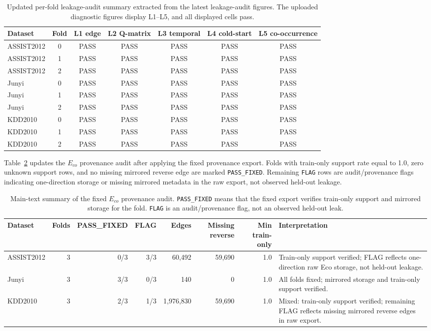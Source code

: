 \documentclass[11pt,a4paper]{article}
\newcommand{\Eco}{$E_{co}$}
\begin{document}
\begin{table}[H]
\centering
\caption{Updated per-fold leakage-audit summary extracted from the latest leakage-audit figures. The uploaded diagnostic figures display L1--L5, and all displayed cells pass.}
\label{tab:leakage}
\begin{tabular}{lcccccc}
\toprule
Dataset & Fold & L1 edge & L2 Q-matrix & L3 temporal & L4 cold-start & L5 co-occurrence \\
\midrule
ASSIST2012 & 0 & PASS & PASS & PASS & PASS & PASS \\
ASSIST2012 & 1 & PASS & PASS & PASS & PASS & PASS \\
ASSIST2012 & 2 & PASS & PASS & PASS & PASS & PASS \\
Junyi & 0 & PASS & PASS & PASS & PASS & PASS \\
Junyi & 1 & PASS & PASS & PASS & PASS & PASS \\
Junyi & 2 & PASS & PASS & PASS & PASS & PASS \\
KDD2010 & 0 & PASS & PASS & PASS & PASS & PASS \\
KDD2010 & 1 & PASS & PASS & PASS & PASS & PASS \\
KDD2010 & 2 & PASS & PASS & PASS & PASS & PASS \\
\bottomrule
\end{tabular}
\end{table}


Table~\ref{tab:eco-prov} updates the \Eco{} provenance audit after applying the fixed provenance export. Folds with train-only support rate equal to 1.0, zero unknown support rows, and no missing mirrored reverse edge are marked \texttt{PASS\_FIXED}. Remaining \texttt{FLAG} rows are audit/provenance flags indicating one-direction storage or missing mirrored metadata in the raw export, not observed held-out leakage.

\begin{table}[H]
\centering
\caption{Main-text summary of the fixed \Eco{} provenance audit. \texttt{PASS\_FIXED} means that the fixed export verifies train-only support and mirrored storage for the fold. \texttt{FLAG} is an audit/provenance flag, not an observed held-out leak.}
\label{tab:eco-prov}
\scriptsize
\begin{tabularx}{\textwidth}{lrrrrrrX}
\toprule
Dataset & Folds & PASS\_FIXED & FLAG & Edges & Missing reverse & Min train-only & Interpretation \\
\midrule
ASSIST2012 & 3 & 0/3 & 3/3 & 60,492 & 59,690 & 1.0 & Train-only support verified; FLAG reflects one-direction raw Eco storage, not held-out leakage. \\
Junyi & 3 & 3/3 & 0/3 & 140 & 0 & 1.0 & All folds fixed; mirrored storage and train-only support verified. \\
KDD2010 & 3 & 2/3 & 1/3 & 1,976,830 & 59,690 & 1.0 & Mixed: train-only support verified; remaining FLAG reflects missing mirrored reverse edges in raw export. \\
\bottomrule
\end{tabularx}
\end{table}
\end{document}
